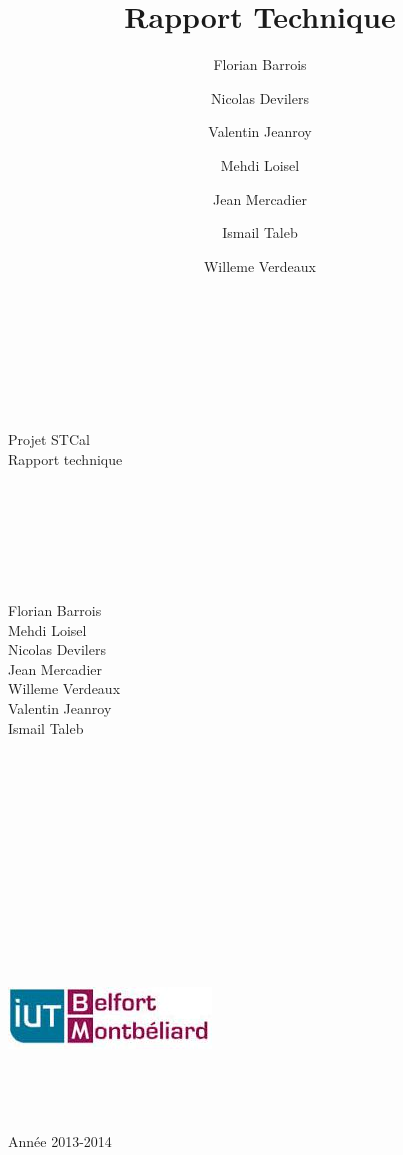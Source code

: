 \documentclass[a4paper,10pt]{report}
\title{Rapport Technique}
\author{Florian Barrois \and Nicolas Devilers \and Valentin Jeanroy \and Mehdi Loisel \and Jean Mercadier \and Ismail Taleb \and Willeme Verdeaux}
\begin{document}
  \begin{titlepage}

    \begin{center}
    ~\\~\\~\\~\\~\\
    \Huge
    Projet STCal\\
    \LARGE
    Rapport technique\\
    ~\\~\\~\\~\\~\\~\\
      \begin{multicols}{3}
	\large
	Florian Barrois\\Mehdi Loisel\\
	\columnbreak 
	Nicolas Devilers\\Jean Mercadier\\Willeme Verdeaux\\
	\columnbreak
	Valentin Jeanroy\\Ismail Taleb
      \end{multicols}
    \end{center}


  \begin{center}
  ~\\~\\~\\~\\~\\~\\~\\~\\~\\~\\~\\~\\
  \includegraphics{../general/iutbm.jpeg}
  ~\\~\\~\\~\\~\\
  \large
  Année 2013-2014
  \end{center}

\end{titlepage}
\end{document}
